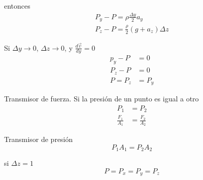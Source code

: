 entonces 
\[
    \begin{split}
        P_{y} - P = \rho \frac{ \Delta y }{ 2 } a_{y} \\
        P_{z} - P = \frac{ \rho }{ 2 } (g + a_{z}) \Delta z
    \end{split}
\]

Si \( \Delta y \to 0 \), \( \Delta z \to 0 \), y \( \frac{ d \Vec{v} }{ dy } = 0 \)
\[
    \begin{split}
        p_{y} - P & = 0 \\
        P_{z} - P & = 0 \\
        P = P_{z} & = P_{y}
    \end{split}
\]

Transmisor de fuerza. Si la presión de un punto es igual a otro
\[
    \begin{split}
        P_{1} & = P_{2} \\
        \frac{ F_{1} }{ A_{1} } & = \frac{ F_{2} }{ A_{2} }
    \end{split}
\]


Transmisor de presión
\[
    P_{1} A_{1} = P_{2} A_{2}
\]


si \( \Delta z = 1 \)
\[
    P = P_{x} = P_{y} = P_{z}
\]
